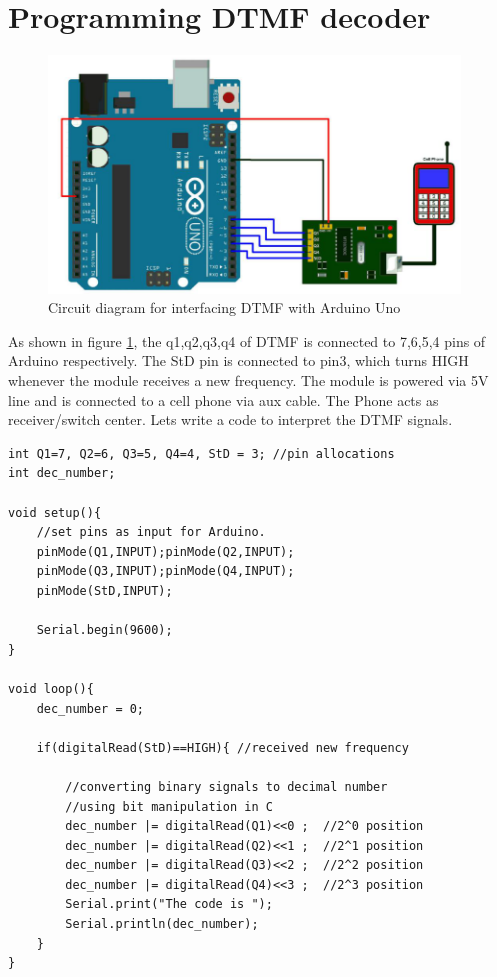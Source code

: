 \section{Programming DTMF decoder}
\begin{figure}
    \centering
    \includegraphics[width=4.3in]{Images/DTMF/DTMF_ckt.png}
    \caption[DTMF with Arduino]{Circuit diagram for interfacing \ac{DTMF} with Arduino Uno }
    \label{fig:dtmf_ckt}
\end{figure}

\par As shown in figure \ref{fig:dtmf_ckt}, the q1,q2,q3,q4 of \ac{DTMF} is connected to 7,6,5,4 pins of Arduino respectively. The StD pin is connected to pin3, which turns HIGH whenever the module receives a new frequency. The module is powered via 5V line and is connected to a cell phone via aux cable. The Phone acts as receiver/switch center. Lets write a code to interpret the \ac{DTMF} signals.
\vspace{0.2cm}
\begin{lstlisting}[style=CStyle]
int Q1=7, Q2=6, Q3=5, Q4=4, StD = 3; //pin allocations
int dec_number;

void setup(){
    //set pins as input for Arduino.
    pinMode(Q1,INPUT);pinMode(Q2,INPUT);
    pinMode(Q3,INPUT);pinMode(Q4,INPUT);
    pinMode(StD,INPUT);
    
    Serial.begin(9600);
}

void loop(){
    dec_number = 0;
    
    if(digitalRead(StD)==HIGH){ //received new frequency
    
        //converting binary signals to decimal number
        //using bit manipulation in C
        dec_number |= digitalRead(Q1)<<0 ;  //2^0 position
        dec_number |= digitalRead(Q2)<<1 ;	//2^1 position
        dec_number |= digitalRead(Q3)<<2 ;	//2^2 position
        dec_number |= digitalRead(Q4)<<3 ;	//2^3 position
        Serial.print("The code is "); 
        Serial.println(dec_number);
    }
}
\end{lstlisting}

